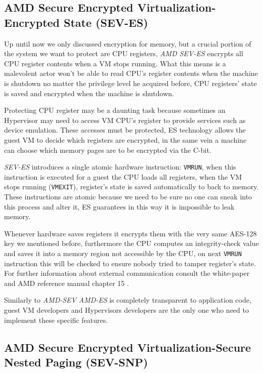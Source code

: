 \documentclass[twocolumn]{article}
\begin{document}
\subsection{AMD Secure Encrypted Virtualization-Encrypted State (SEV-ES)}

Up until now we only discussed encryption for memory, but a crucial portion of the system we want to protect are CPU registers, \textit{AMD SEV-ES} encrypts all CPU register contents when a VM stops running. What this means is a malevolent actor won't be able to read CPU's register contents when the machine is shutdown no matter the privilege level he acquired before, CPU registers' state is saved and encrypted when the machine is shutdown.

Protecting CPU register may be a daunting task because sometimes an Hypervisor may need to access VM CPU's register to provide services such as device emulation. These accesses must be protected, ES technology allows the guest VM to decide which registers are encrypted, in the same vein a machine can choose which memory pages are to be encrypted via the C-bit.

\textit{SEV-ES} introduces a single atomic hardware instruction: \texttt{VMRUN}, when this instruction is executed for a guest the CPU loads all registers, when the VM stops running (\texttt{VMEXIT}), register's state is saved automatically to  back to memory. These instructions are atomic because we need to be sure no one can sneak into this process and alter it, ES guarantees in this way it is impossible to leak memory.

Whenever hardware saves registers it encrypts them with the very same AES-128 key we mentioned before, furthermore the CPU computes an integrity-check value and saves it into a memory region not accessible by the CPU, on next \texttt{VMRUN} instruction this will be checked to ensure nobody tried to tamper register's state. For further information about external communication consult the white-paper \cite{protecting-registers} and AMD reference manual chapter 15 \cite{architecture-reference}.

Similarly to \textit{AMD-SEV} \textit{AMD-ES} is completely transparent to application code, guest VM developers and Hypervisors developers are the only one who  need to implement these specific features.

\subsection{AMD Secure Encrypted Virtualization-Secure Nested Paging (SEV-SNP)}
\end{document}
